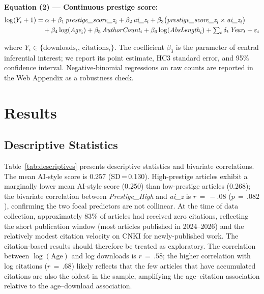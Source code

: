 \documentclass[12pt,a4paper]{article}
\begin{document}
\noindent\textbf{Equation (2) --- Continuous prestige score:}
\begin{align}
\log(Y_i+1) &= \alpha
  + \beta_1\,\textit{prestige\_score\_z}_i
  + \beta_2\,\textit{ai\_z}_i
  + \beta_3\bigl(\textit{prestige\_score\_z}_i\times\textit{ai\_z}_i\bigr)
  \notag\\
  &\quad
  + \beta_4\log(\textit{Age}_i)
  + \beta_5\,\textit{AuthorCount}_i
  + \beta_6\log(\textit{AbsLength}_i)
  + \textstyle\sum_{t}\delta_t\,\textit{Year}_t
  + \varepsilon_i
\label{eq:score}
\end{align}

\noindent
where $Y_i\in\{\text{downloads}_i,\,\text{citations}_i\}$.
The coefficient $\beta_3$ is the parameter of central inferential
interest; we report its point estimate, HC3 standard error, and 95\%
confidence interval.
Negative-binomial regressions on raw counts are reported in the
Web Appendix as a robustness check.

\section{Results}
\label{sec:results}

\subsection{Descriptive Statistics}

Table~\ref{tab:descriptives} presents descriptive statistics and
bivariate correlations.
The mean AI-style score is 0.257 (SD\,=\,0.130).
High-prestige articles exhibit a marginally lower mean AI-style score
(0.250) than low-prestige articles (0.268); the bivariate correlation
between \textit{Prestige\_High} and \textit{ai\_z} is $r\,=\,{-}.08$
($p\,=\,.082$), confirming the two focal predictors are not collinear.
At the time of data collection, approximately 83\% of articles had
received zero citations, reflecting the short publication window
(most articles published in 2024--2026) and the relatively modest
citation velocity on CNKI for newly-published work.
The citation-based results should therefore be treated as exploratory.
The correlation between $\log(\text{Age})$ and log downloads is
$r\,=\,.58$; the higher correlation with log citations ($r\,=\,.68$)
likely reflects that the few articles that have accumulated citations
are also the oldest in the sample, amplifying the age--citation
association relative to the age--download association.
\end{document}
